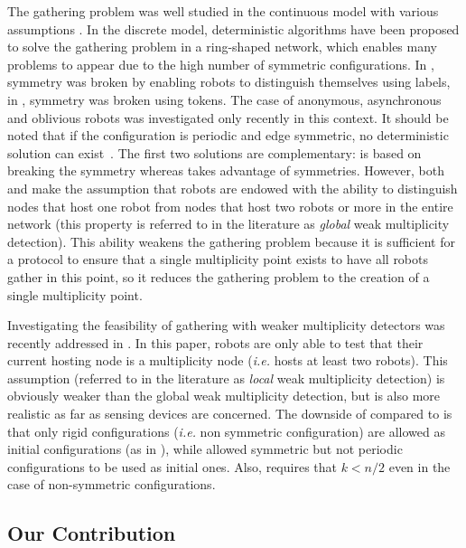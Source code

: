 \documentclass[11pt]{article}
\begin{document}
The gathering problem was well studied in the continuous model with various assumptions \cite{Ciel03,Ciel04,Flocchin05,Prencipe05}. In the discrete model, deterministic algorithms have been proposed to solve the gathering problem in a ring-shaped network, which enables many problems to appear due to the high number of symmetric configurations. In \cite{Marco06,Kowalski04,Dessmark06}, symmetry was broken by enabling robots to distinguish themselves using labels, in \cite{Flocchin04}, symmetry was broken using tokens. The case of anonymous, asynchronous and oblivious robots was investigated only recently in this context. It should be noted that if the configuration is periodic and edge symmetric, no deterministic solution can exist~\cite{Klasing06}. The first two solutions \cite{Klasing06,Klasing08} are complementary: \cite{Klasing06} is based on breaking the symmetry whereas \cite{Klasing08} takes advantage of symmetries. However, both \cite{Klasing06} and \cite{Klasing08} make the assumption that robots are endowed with the ability to distinguish nodes that host one robot from nodes that host two robots or more in the entire network (this property is referred to in the literature as \emph{global} weak multiplicity detection). This ability weakens the gathering problem because it is sufficient for a protocol to ensure that a single multiplicity point exists to have all robots gather in this point, so it reduces the gathering problem to the creation of a single multiplicity point.

Investigating the feasibility of gathering with weaker multiplicity detectors was recently addressed in \cite{Izumi10}. In this paper, robots are only able to test that their current hosting node is a multiplicity node (\emph{i.e.} hosts at least two robots). This assumption (referred to in the literature as \emph{local} weak multiplicity detection) is obviously weaker than the global weak multiplicity detection, but is also more realistic as far as sensing devices are concerned. The downside of \cite{Izumi10} compared to \cite{Klasing08} is that only rigid configurations (\emph{i.e.} non symmetric configuration) are allowed as initial configurations (as in  \cite{Klasing06}), while \cite{Klasing08} allowed symmetric but not periodic configurations to be used as initial ones. Also, \cite{Izumi10} requires that $k < n/2$ even in the case of non-symmetric configurations.

\subsection{Our Contribution}
\end{document}
